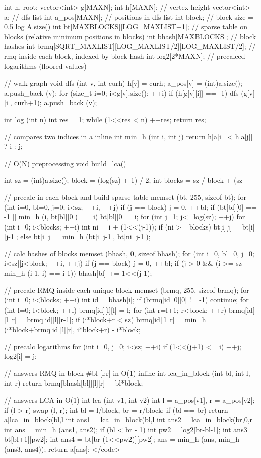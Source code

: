 int n, root;
vector<int> g[MAXN];
int h[MAXN]; // vertex height
vector<int> a; // dfs list
int a_pos[MAXN]; // positions in dfs list
int block; // block size = 0.5 log A.size()
int bt[MAXBLOCKS][LOG_MAXLIST+1]; // sparse table on blocks (relative minimum positions in blocks)
int bhash[MAXBLOCKS]; // block hashes
int brmq[SQRT_MAXLIST][LOG_MAXLIST/2][LOG_MAXLIST/2]; // rmq inside each block, indexed by block hash
int log2[2*MAXN]; // precalced logarithms (floored values)

// walk graph
void dfs (int v, int curh) {
	h[v] = curh;
	a_pos[v] = (int)a.size();
	a.push_back (v);
	for (size_t i=0; i<g[v].size(); ++i)
		if (h[g[v][i]] == -1) {
			dfs (g[v][i], curh+1);
			a.push_back (v);
		}
}

int log (int n) {
	int res = 1;
	while (1<<res < n)  ++res;
	return res;
}

// compares two indices in a
inline int min_h (int i, int j) {
	return h[a[i]] < h[a[j]] ? i : j;
}

// O(N) preprocessing
void build_lca() {
	int sz = (int)a.size();
	block = (log(sz) + 1) / 2;
	int blocks = sz / block + (sz %

	// precalc in each block and build sparse table
	memset (bt, 255, sizeof bt);
	for (int i=0, bl=0, j=0; i<sz; ++i, ++j) {
		if (j == block)
			j = 0,  ++bl;
		if (bt[bl][0] == -1 || min_h (i, bt[bl][0]) == i)
			bt[bl][0] = i;
	}
	for (int j=1; j<=log(sz); ++j)
		for (int i=0; i<blocks; ++i) {
			int ni = i + (1<<(j-1));
			if (ni >= blocks)
				bt[i][j] = bt[i][j-1];
			else
				bt[i][j] = min_h (bt[i][j-1], bt[ni][j-1]);
		}

	// calc hashes of blocks
	memset (bhash, 0, sizeof bhash);
	for (int i=0, bl=0, j=0; i<sz||j<block; ++i, ++j) {
		if (j == block)
			j = 0,  ++bl;
		if (j > 0 && (i >= sz || min_h (i-1, i) == i-1))
			bhash[bl] += 1<<(j-1);
	}

	// precalc RMQ inside each unique block
	memset (brmq, 255, sizeof brmq);
	for (int i=0; i<blocks; ++i) {
		int id = bhash[i];
		if (brmq[id][0][0] != -1)  continue;
		for (int l=0; l<block; ++l) {
			brmq[id][l][l] = l;
			for (int r=l+1; r<block; ++r) {
				brmq[id][l][r] = brmq[id][l][r-1];
				if (i*block+r < sz)
					brmq[id][l][r] =
						min_h (i*block+brmq[id][l][r], i*block+r) - i*block;
			}
		}
	}

	// precalc logarithms
	for (int i=0, j=0; i<sz; ++i) {
		if (1<<(j+1) <= i)  ++j;
		log2[i] = j;
	}
}

// answers RMQ in block #bl [l;r] in O(1)
inline int lca_in_block (int bl, int l, int r) {
	return brmq[bhash[bl]][l][r] + bl*block;
}

// answers LCA in O(1)
int lca (int v1, int v2) {
	int l = a_pos[v1],  r = a_pos[v2];
	if (l > r)  swap (l, r);
	int bl = l/block,  br = r/block;
	if (bl == br)
		return a[lca_in_block(bl,l%
	int ans1 = lca_in_block(bl,l%
	int ans2 = lca_in_block(br,0,r%
	int ans = min_h (ans1, ans2);
	if (bl < br - 1) {
		int pw2 = log2[br-bl-1];
		int ans3 = bt[bl+1][pw2];
		int ans4 = bt[br-(1<<pw2)][pw2];
		ans = min_h (ans, min_h (ans3, ans4));
	}
	return a[ans];
}</code>